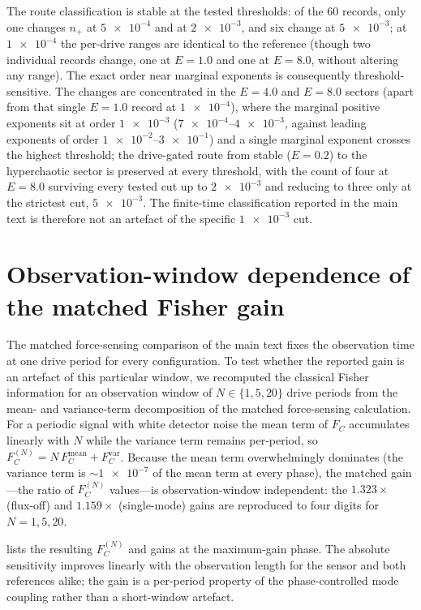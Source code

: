 \documentclass[preprint,numbers,a4paper]{elsarticle}
\begin{document}
The route classification is stable at the tested thresholds: of the 60 records, only one changes $n_{+}$ at $\num{5e-4}$ and at $\num{2e-3}$, and six change at $\num{5e-3}$; at $\num{1e-4}$ the per-drive ranges are identical to the reference (though two individual records change, one at $E=\num{1.0}$ and one at $E=\num{8.0}$, without altering any range). The exact order near marginal exponents is consequently threshold-sensitive. The changes are concentrated in the $E=\num{4.0}$ and $E=\num{8.0}$ sectors (apart from that single $E=\num{1.0}$ record at $\num{1e-4}$), where the marginal positive exponents sit at order $\num{1e-3}$ ($\num{7e-4}$--$\num{4e-3}$, against leading exponents of order $\num{1e-2}$--$\num{3e-1}$) and a single marginal exponent crosses the highest threshold; the drive-gated route from stable ($E=\num{0.2}$) to the hyperchaotic sector is preserved at every threshold, with the count of four at $E=\num{8.0}$ surviving every tested cut up to $\num{2e-3}$ and reducing to three only at the strictest cut, $\num{5e-3}$. The finite-time classification reported in the main text is therefore not an artefact of the specific $\num{1e-3}$ cut.

\section{Observation-window dependence of the matched Fisher gain}
\label{SI-sec:fisher-window}

The matched force-sensing comparison of the main text fixes the observation time at one drive period for every configuration. To test whether the reported gain is an artefact of this particular window, we recomputed the classical Fisher information for an observation window of $N\in\{1,5,20\}$ drive periods from the mean- and variance-term decomposition of the matched force-sensing calculation. For a periodic signal with white detector noise the mean term of $F_C$ accumulates linearly with $N$ while the variance term remains per-period, so $F_C^{(N)}=N\,F_C^{\mathrm{mean}}+F_C^{\mathrm{var}}$. Because the mean term overwhelmingly dominates (the variance term is $\sim\num{1e-7}$ of the mean term at every phase), the matched gain---the ratio of $F_C^{(N)}$ values---is observation-window independent: the $\num{1.323}\times$ (flux-off) and $\num{1.159}\times$ (single-mode) gains are reproduced to four digits for $N=1,5,20$.

 lists the resulting $F_C^{(N)}$ and gains at the maximum-gain phase. The absolute sensitivity improves linearly with the observation length for the sensor and both references alike; the gain is a per-period property of the phase-controlled mode coupling rather than a short-window artefact.
\end{document}

